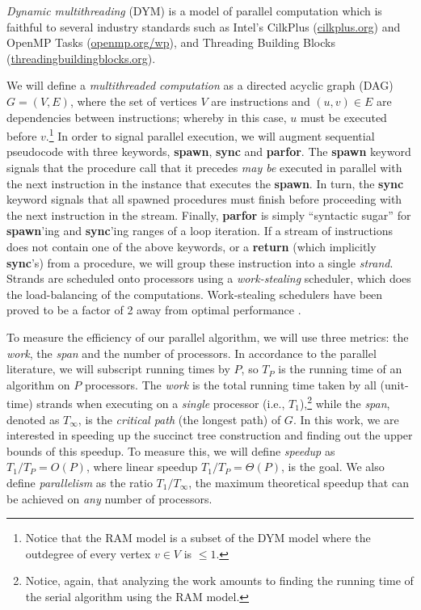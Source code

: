 {\em Dynamic multithreading} (DYM) \cite[Chapter 27]{Cormen2009} is a
model of parallel computation which is faithful to several industry standards
such as Intel's CilkPlus (\url{cilkplus.org}) and OpenMP Tasks
(\url{openmp.org/wp}), and Threading Building
Blocks (\url{threadingbuildingblocks.org}).

We will define a {\em multithreaded computation} as a directed acyclic
graph (DAG) $G=(V,E)$, where the set of vertices $V$ are instructions
and $(u,v) \in E$ are dependencies between instructions; whereby in
this case, $u$ must be executed before $v$.\footnote{Notice that the
  RAM model is a subset of the DYM model where the outdegree of every
  vertex $v \in V$ is $\leq 1$.} In order to signal parallel
execution, we will augment sequential pseudocode with three keywords,
{\bf spawn}, {\bf sync} and {\bf parfor}. The {\bf spawn} keyword
signals that the procedure call that it precedes {\em may be} executed
in parallel with the next instruction in the instance that executes
the {\bf spawn}. In turn, the {\bf sync} keyword signals that all
spawned procedures must finish before proceeding with the next
instruction in the stream. Finally, {\bf parfor} is simply ``syntactic
sugar'' for {\bf spawn}'ing and {\bf sync}'ing ranges of a loop
iteration. If a stream of instructions does not contain one of the
above keywords, or a {\bf return} (which implicitly {\bf sync}'s) from
a procedure, we will group these instruction into a single {\em
  strand}. Strands are scheduled onto processors using a {\em
  work-stealing} scheduler, which does the load-balancing of the
computations. Work-stealing schedulers have been proved to be a factor
of 2 away from optimal performance
\cite{Blumofe:1999:SMC:324133.324234}.

To measure the efficiency of our parallel algorithm, we
will use three metrics: the {\em work}, the {\em span} and the number
of processors. In accordance to the parallel literature, we will
subscript running times by $P$, so $T_P$ is the running time of an
algorithm on $P$ processors. The {\em work} is the total running time
taken by all (unit-time) strands when executing on a {\em single}
processor (i.e., $T_1$),\footnote{Notice, again, that analyzing the
  work amounts to finding the running time of the serial algorithm
  using the RAM model.} while the {\em span}, denoted as $T_\infty$,
is the {\em critical path} (the longest path) of $G$. In this work,
we are interested in speeding up the succinct tree construction and finding
out the upper bounds of this speedup. To measure this, we will define
{\em speedup} as $T_1/T_P = O(P)$, where linear speedup $T_1/T_P =
\Theta(P)$, is the goal. We also define {\em parallelism} as the ratio
$T_1/T_{\infty}$, the maximum theoretical speedup that can be achieved
on {\em any} number of processors.
